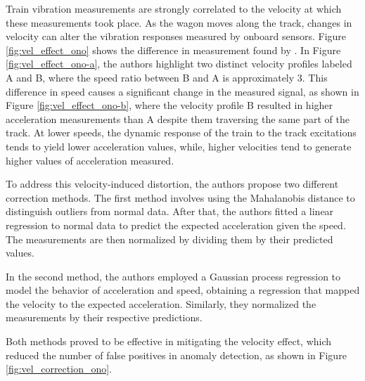 Train vibration measurements are strongly correlated to the velocity at which these measurements took place. As the wagon moves along the track, changes in velocity can alter the vibration responses measured by onboard sensors. Figure \ref{fig:vel_effect_ono} shows the difference in measurement found by \cite{Hironori_ONO202322-00239}. In Figure \ref{fig:vel_effect_ono-a}, the authors highlight two distinct velocity profiles labeled A and B, where the speed ratio between B and A is approximately 3. This difference in speed causes a significant change in the measured signal, as shown in Figure \ref{fig:vel_effect_ono-b}, where the velocity profile B resulted in higher acceleration measurements than A despite them traversing the same part of the track. At lower speeds, the dynamic response of the train to the track excitations tends to yield lower acceleration values, while, higher velocities tend to generate higher values of acceleration measured.

To address this velocity-induced distortion, the authors propose two different correction methods. The first method involves using the Mahalanobis distance \cite{de2000mahalanobis} to distinguish outliers from normal data. After that, the authors fitted a linear regression to normal data to predict the expected acceleration given the speed. The measurements are then normalized by dividing them by their predicted values.

In the second method, the authors employed a Gaussian process regression \cite{williams1995gaussian} to model the behavior of acceleration and speed, obtaining a regression that mapped the velocity to the expected acceleration. Similarly, they normalized the measurements by their respective predictions. 

Both methods proved to be effective in mitigating the velocity effect, which reduced the number of false positives in anomaly detection, as shown in Figure \ref{fig:vel_correction_ono}.

